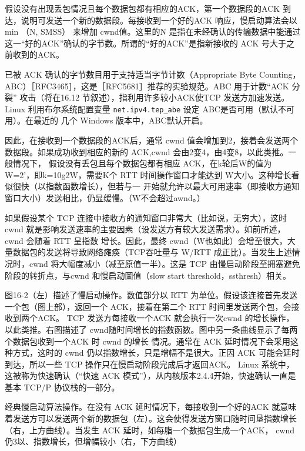 假设没有出现丢包情况且每个数据包都有相应的ACK，第一个数据段的ACK 到达，说明可发送一个新的数据段。每接收到一个好的ACK 响应，慢启动算法会以 min （N, SMSS）
来增加 cwnd值。这里的N 是指在未经确认的传输数据中能通过这一“好的ACK”确认的字节数。所谓的“好的ACK”是指新接收的 ACK 号大于之前收到的ACK。

\begin{tcolorbox}
    已被 ACK 确认的字节数目用于支持适当字节计数（Appropriate Byte Counting，ABC）［RFC3465］，这是［RFC5681］推荐的实验规范。ABC 用于计数“ACK 分裂”
    攻击（将在16.12 节叙述），指利用许多较小ACK使TCP 发送方加速发送。Linux 利用布尔系统配置变量 \verb|net.ipv4.tep_abe| 设定 ABC是否可用（默认不可用）。在最近的
    几个 Windows 版本中，ABC默认开启。
\end{tcolorbox}

因此，在接收到一个数据段的ACK后，通常 cwnd 值会增加到2，接着会发送两个数据段。如果成功收到相应的新的 ACK,cwnd 会由2变4，由4变8，以此类推。一般情况下，
假设没有丢包且每个数据包都有相应 ACK，在k轮后W的值为W=2’，即k=10g2W，需要K个 RTT 时间操作窗口才能达到 W大小。这种增长看似很快（以指数函数增长），但若与一
开始就允许以最大可用速率（即接收方通知窗口大小）发送相比，仍显缓慢。（W不会超过awnd。）

如果假设某个 TCP 连接中接收方的通知窗口非常大（比如说，无穷大），这时 cwnd 就是影响发送速率的主要因素（设发送方有较大发送需求）。如前所述，cwnd 会随着 RTT 呈指数
增长。因此，最终 cwnd（W也如此）会增至很大，大量数据包的发送将导致网络瘫痪（TCP吞吐量与 W/RTT 成正比）。当发生上述情况时，cwnd 将大幅度减小（减至原值一半）。这是
TCP 由慢启动阶段至拥塞避免阶段的转折点，与cwnd 和慢启动圖值（slow start threshold，ssthresh）相关。

图16-2（左）描述了慢启动操作。数值部分以 RTT 为单位。假设该连接首先发送一个包（图上部），返回一个 ACK，接着在第二个 RTT 时间里发送两个包，会接收到两个ACK。
TCP 发送方每接收一个ACK 就会执行一次cwnd 的增长操作，以此类推。右图描述了 cwnd随时间增长的指数函数。图中另一条曲线显示了每两个数据包收到一个ACK 时 cwnd 的增长
情况。通常在 ACK 延时情况下会采用这种方式，这时的 cwnd 仍以指数增长，只是增幅不是很大。正因 ACK 可能会延时到达，所以一些 TCP 操作只在慢启动阶段完成后才返回ACK。
Linux 系统中，这被称为快速确认（“快速 ACK 模式”），从内核版本2.4.4开始，快速确认一直是基本 TCP/P 协议栈的一部分。


经典慢启动算法操作。在没有 ACK 延时情况下，每接收到一个好的ACK 就意味着发送方可以发送两个新的数据包（左）。这会使得发送方窗口随时间垦指数增长（右，上方曲线）。当发生
ACK 延时，如每脂一个數据包生成一个ACK， cwnd 仍3以、指数增长，但增幅较小（右，下方曲线）

